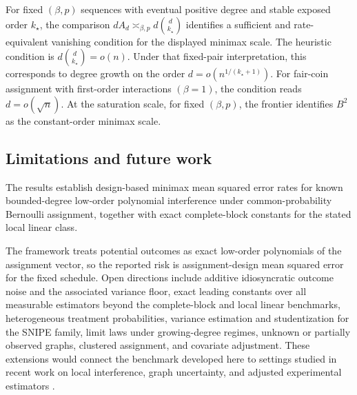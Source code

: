 For fixed \((\beta,p)\) sequences with eventual positive degree and stable exposed order \(k_\star\), the comparison \(dA_d\asymp_{\beta,p} d\binom d{k_\star}\) identifies a sufficient and rate-equivalent vanishing condition for the displayed minimax scale. The heuristic condition is \(d\binom d{k_\star}=o(n)\). Under that fixed-pair interpretation, this corresponds to degree growth on the order \(d=o(n^{1/(k_\star+1)})\). For fair-coin assignment with first-order interactions \((\beta=1)\), the condition reads \(d=o(\sqrt n)\). At the saturation scale, for fixed \((\beta,p)\), the frontier identifies \(B^2\) as the constant-order minimax scale.

\subsection{Limitations and future work}

The results establish design-based minimax mean squared error rates for known bounded-degree low-order polynomial interference under common-probability Bernoulli assignment, together with exact complete-block constants for the stated local linear class.

The framework treats potential outcomes as exact low-order polynomials of the assignment vector, so the reported risk is assignment-design mean squared error for the fixed schedule. Open directions include additive idiosyncratic outcome noise and the associated variance floor, exact leading constants over all measurable estimators beyond the complete-block and local linear benchmarks, heterogeneous treatment probabilities, variance estimation and studentization for the SNIPE family, limit laws under growing-degree regimes, unknown or partially observed graphs, clustered assignment, and covariate adjustment. These extensions would connect the benchmark developed here to settings studied in recent work on local interference, graph uncertainty, and adjusted experimental estimators \citep{Savje2021,Leung2022,Hu2022,Gao2025,EichhornKhanUganderYu2026,WangLi2026}.
